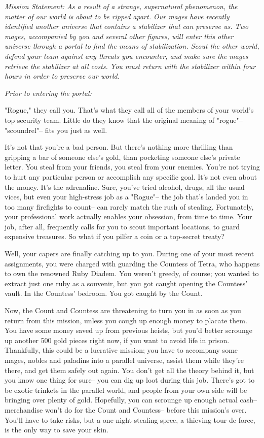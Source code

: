 \documentclass[char]{guildcamp3}
\begin{document}
\name{\cRogueTwo{}}

\em{Mission Statement:} 
As a result of a strange, supernatural phenomenon, the matter of our world is about to be ripped apart. Our mages have recently identified another universe that contains a stabilizer that can preserve us. Two mages, accompanied by you and several other figures, will enter this other universe through a portal to find the means of stabilization. Scout the other world, defend your team against any threats you encounter, and make sure the mages retrieve the stabilizer at all costs. You must return with the stabilizer within four hours in order to preserve our world.

\em{Prior to entering the portal:}

"Rogue," they call you. That's what they call all of the members of your world's top security team. Little do they know that the original meaning of "rogue"-- "scoundrel"-- fits you just as well. 

It's not that you're a bad person. But there's nothing more thrilling than gripping a bar of someone else's gold, than pocketing someone else's private letter. You steal from your friends, you steal from your enemies. You're not trying to hurt any particular person or accomplish any specific goal. It's not even about the money. It's the adrenaline. Sure, you've tried alcohol, drugs, all the usual vices, but even your high-stress job as a "Rogue"-- the job that's landed you in too many firefights to count-- can rarely match the rush of stealing. Fortunately, your professional work actually enables your obsession, from time to time. Your job, after all, frequently calls for you to scout important locations, to guard expensive treasures. So what if you pilfer a coin or a top-secret treaty?

Well, your capers are finally catching up to you. During one of your most recent assignments, you were charged with guarding the Countess of Tetra, who happens to own the renowned Ruby Diadem. You weren't greedy, of course; you wanted to extract just one ruby as a souvenir, but you got caught opening the Countess' vault. In the Countess' bedroom. You got caught by the Count.

Now, the Count and Countess are threatening to turn you in as soon as you return from this mission, unless you cough up enough money to placate them. You have some money saved up from previous heists, but you'd better scrounge up another 500 gold pieces right now, if you want to avoid life in prison. Thankfully, this could be a lucrative mission; you have to accompany some mages, nobles and paladins into a parallel universe, assist them while they're there, and get them safely out again. You don't get all the theory behind it, but you know one thing for sure-- you can dig up loot during this job. There's got to be exotic trinkets in the parallel world, and people from your own side will be bringing over plenty of gold. Hopefully, you can scrounge up enough actual cash-- merchandise won't do for the Count and Countess-- before this mission's over. You'll have to take risks, but a one-night stealing spree, a thieving tour de force, is the only way to save your skin.
\end{document}
